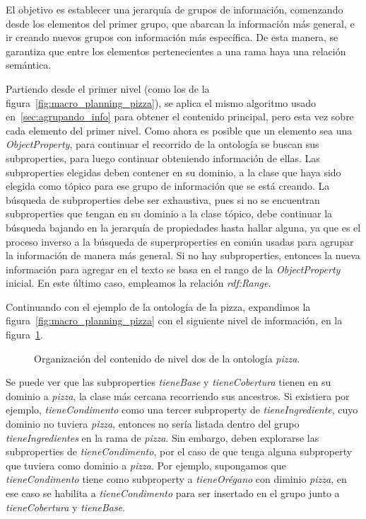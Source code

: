 El objetivo es establecer una jerarquía de grupos de información, comenzando desde los elementos del primer grupo, que abarcan la información más general, e ir creando nuevos grupos con información más específica. De esta manera, se garantiza que entre los elementos pertenecientes a una rama haya una relación semántica.

Partiendo desde el primer nivel (como los de la figura~\ref{fig:macro_planning_pizza}), se aplica el mismo algoritmo usado en~\ref{sec:agrupando_info} para obtener el contenido principal, pero esta vez sobre cada elemento del primer nivel. Como ahora es posible que un elemento sea una \emph{ObjectProperty}, para continuar el recorrido de la ontología se buscan sus subproperties, para luego continuar obteniendo información de ellas. Las subproperties elegidas deben contener en su dominio, a la clase que haya sido elegida como tópico para ese grupo de información que se está creando. La búsqueda de subproperties debe ser exhaustiva, pues si no se encuentran subproperties que tengan en su dominio a la clase tópico, debe continuar la búsqueda bajando en la jerarquía de propiedades hasta hallar alguna, ya que es el proceso inverso a la búsqueda de superproperties en común usadas para agrupar la información de manera más general. Si no hay subproperties, entonces la nueva información para agregar en el texto se basa en el rango de la \emph{ObjectProperty} inicial. En este último caso, empleamos la relación \emph{rdf:Range}.

Continuando con el ejemplo de la ontología de la pizza, expandimos la figura~\ref{fig:macro_planning_pizza} con el siguiente nivel de información, en la figura~\ref{fig:macro_planning_pizza_n2}. 
\begin{figure}[H]
\caption{Organización del contenido de nivel dos de la ontología \emph{pizza}.}
\label{fig:macro_planning_pizza_n2}
\end{figure}

Se puede ver que las subproperties \emph{tieneBase} y \emph{tieneCobertura} tienen en su dominio a \emph{pizza}, la clase más cercana recorriendo sus ancestros. Si existiera por ejemplo, \emph{tieneCondimento} como una tercer subproperty de \emph{tieneIngrediente}, cuyo dominio no tuviera \emph{pizza}, entonces no sería listada dentro del grupo \emph{tieneIngredientes} en la rama de \emph{pizza}. Sin embargo, deben explorarse las subproperties de \emph{tieneCondimento}, por el caso de que tenga alguna subproperty que tuviera como dominio a \emph{pizza}. Por ejemplo, supongamos que \emph{tieneCondimento} tiene como subproperty a \emph{tieneOrégano} con diminio \emph{pizza}, en ese caso se habilita a \emph{tieneCondimento} para ser insertado en el grupo junto a  \emph{tieneCobertura} y \emph{tieneBase}.  

